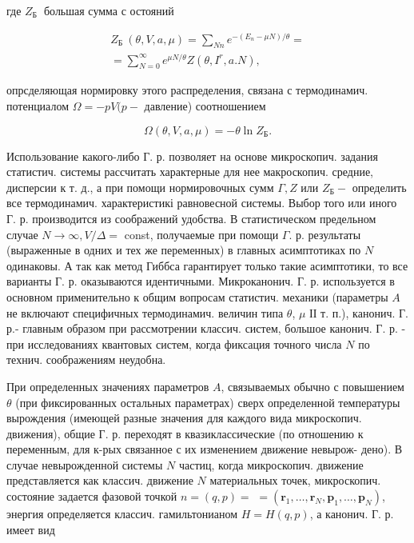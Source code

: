 \documentclass[10pt]{article}
\begin{document}
где $Z_{\text {Б }}$ большая сумма с остояний



\[

\begin{gathered}

Z_{\text {Б }}(\theta, V, a, \mu)=\sum_{N n} e^{-\left(E_{n}-\mu N\right) / \theta}= \\

=\sum_{N=0}^{\infty} e^{\mu N / \theta} Z\left(\theta, I^{r}, a . N\right),

\end{gathered}

\]



опрсделяющая нормировку этого распределения, связана с термодинамич. потенциалом $\Omega=-p V(p-$ давление) соотношением



\[

\Omega(\theta, V, a, \mu)=-\theta \ln Z_{\mathrm{Б}} .

\]



Использование какого-либо $Г$. р. позволяет на основе микроскопич. задания статистич. системы рассчитать характерные для нее макроскопич. средние, дисперсии к т. д., а при помощи нормировочных сумм $\Gamma, Z$ или $Z_{Б}-$ определить все термодинамич. характеристикі равновесной системы. Выбор того или иного Г. р. производится из соображений удобства. В статистическом предельном случае $N \rightarrow \infty, V / \Delta=$ const, получаемые при помощи $\Gamma$. р. результаты (выраженные в одних и тех же переменных) в главных асимптотиках по $N$ одинаковы. А так как метод Гиббса гарантирует только такие асимптотики, то все варианты Г. р. оказываются идентичными. Микроканонич. Г. р. используется в основном применительно к общим вопросам статистич. механики (параметры $A$ не включают специфичных термодинамич. величин типа $\theta$, $\mu$ ІІ т. п.), канонич. Г. р.- главным образом при рассмотрении классич. систем, большое канонич. Г. р. - при исследованиях квантовых систем, когда фиксация точного числа $N$ по технич. соображениям неудобна.



При определенных значениях параметров $A$, связываемых обычно с повышением $\theta$ (при фиксированных остальных параметрах) сверх определенной температуры вырождения (имеющей разные значения для каждого вида микроскопич. движения), общие Г. р. переходят в квазиклассические (по отношению к переменным, для к-рых связанное с их изменением движение невырож- дено). В случае невырожденной системы $N$ частиц, когда микроскопич. движение представляется как классич. движение $N$ материальных точек, микроскопич. состояние задается фазовой точкой $n=(q, p)=$ $=\left(\boldsymbol{r}_{1}, \ldots, \boldsymbol{r}_{N}, \boldsymbol{p}_{1}, \ldots, \boldsymbol{p}_{N}\right)$, энергия определяется классич. гамильтонианом $H=H(q, p)$, а канонич. Г. р. имеет вид
\end{document}
